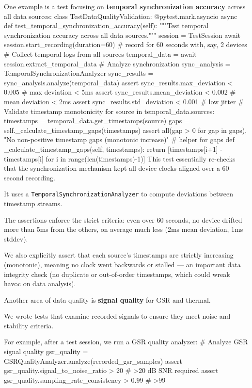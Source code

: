 {{{One example is a test focusing on \textbf{temporal synchronization accuracy}
 across all data sources: class TestDataQualityValidation: @pytest.mark.asyncio async def test_temporal_synchronization_accuracy(self): """Test temporal synchronization accuracy across all data sources.""" session = TestSession await session.start_recording(duration=60) # record for 60 seconds with, say, 2 devices # Collect temporal logs from all sources temporal_data = await session.extract_temporal_data # Analyze synchronization sync_analysis = TemporalSynchronizationAnalyzer sync_results = sync_analysis.analyze(temporal_data) assert sync_results.max_deviation < 0.005 # max deviation < 5ms assert sync_results.mean_deviation < 0.002 # mean deviation < 2ms assert sync_results.std_deviation < 0.001 # low jitter # Validate timestamp monotonicity for source in temporal_data.sources: timestamps = temporal_data.get_timestamps(source) gaps = self._calculate_timestamp_gaps(timestamps) assert all(gap > 0 for gap in gaps), "No non-positive timestamp gaps (monotonic increase)" # helper for gaps def _calculate_timestamp_gaps(self, timestamps): return [timestamps[i+1] - timestamps[i] for i in range(len(timestamps)-1)] This test essentially re-checks that the synchronization mechanism kept all device clocks aligned over a 60-second recording.

It uses a \texttt{TemporalSynchronizationAnalyzer} to compute deviations between timestamp streams.

The assertions enforce the strict criteria: even over 60 seconds, no device drifted more than 5ms from the others, on average much less (2ms mean deviation, 1ms stddev).

We also explicitly assert that each source's timestamps are strictly increasing (monotonic), meaning no clock went backwards or stalled --- an important data integrity check (no duplicate or out-of-order timestamps, which could wreak havoc on data analysis).

Another area of data quality is \textbf{signal quality}
 for GSR and thermal.

We wrote tests that examine recorded signals to ensure they meet noise and stability criteria.

For example, after a test session, we run a GSR quality analyzer: # Analyze GSR signal quality gsr_quality = GSRQualityAnalyzer.analyze(recorded_gsr_samples) assert gsr_quality.signal_to_noise_ratio > 20 # >20 dB SNR required assert gsr_quality.sampling_rate_consistency > 0.99 # >99%

}}}
